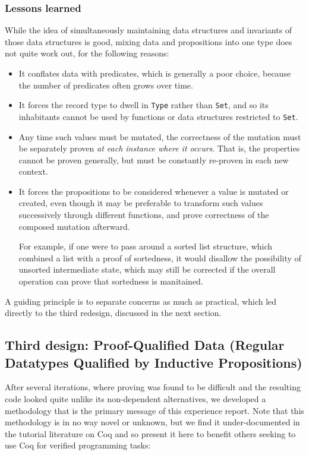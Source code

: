 \documentclass{llncs}
\begin{document}
\subsubsection*{Lessons learned}

While the idea of simultaneously maintaining data structures and
invariants of those data structures is good, mixing data and
propositions into one type does not quite work out, for the following
reasons: 

\begin{itemize}
\item It conflates data with predicates, which is generally a poor choice,
  because the number of predicates often grows over time.

\item It forces the record type to dwell in \texttt{Type} rather than
  \texttt{Set}, and so its inhabitants cannot be used by functions or data
  structures restricted to \texttt{Set}.

\item Any time such values must be mutated, the correctness of the mutation
  must be separately proven \emph{at each instance where it occurs}.  That is,
  the properties cannot be proven generally, but must be constantly re-proven
  in each new context.

\item It forces the propositions to be considered whenever a value is mutated
  or created, even though it may be preferable to transform such values
  successively through different functions, and prove correctness of the
  composed mutation afterward.

  For example, if one were to pass around a sorted list structure, which
  combined a list with a proof of sortedness, it would disallow the
  possibility of unsorted intermediate state, which may still be corrected if
  the overall operation can prove that sortedness is manitained.
\end{itemize}

A guiding principle is to separate concerns as much as practical, which led
directly to the third redesign, discussed in the next section.  

\subsection{Third design: Proof-Qualified Data (Regular Datatypes Qualified by Inductive
  Propositions)}
\label{sec:splitdesign}

After several iterations, where proving was found to be difficult and
the resulting code looked quite unlike its non-dependent alternatives,
we developed a methodology that is the primary message of this
experience report.  Note that this methodology is in no way novel or
unknown, but we find it under-documented in the tutorial literature on
Coq and so present it here to benefit others seeking to use Coq for
verified programming tasks:
\end{document}
